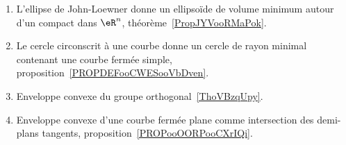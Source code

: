 
	\label{THEMEooEnveloppes}
\begin{enumerate}
	\item
	      L'ellipse de John-Loewner donne un ellipsoïde de volume minimum autour d'un compact dans \( \eR^n\), théorème~\ref{PropJYVooRMaPok}.
	\item
	      Le cercle circonscrit à une courbe donne un cercle de rayon minimal contenant une courbe fermée simple, proposition~\ref{PROPDEFooCWESooVbDven}.
	\item Enveloppe convexe du groupe orthogonal~\ref{ThoVBzqUpy}.
	\item Enveloppe convexe d'une courbe fermée plane comme intersection des demi-plans tangents, proposition~\ref{PROPooOORPooCXrIQi}.
\end{enumerate}
